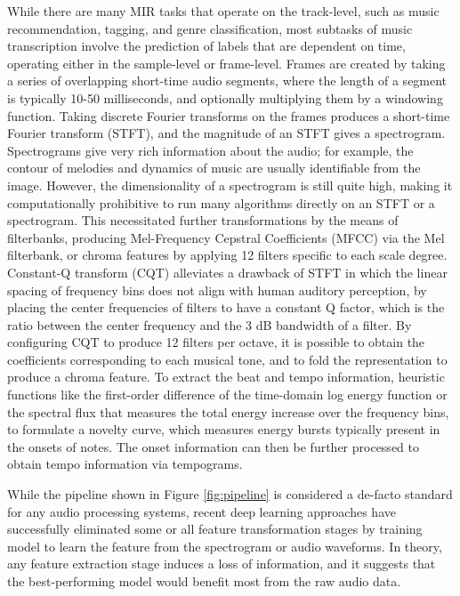 While there are many MIR tasks that operate on the track-level, such as music recommendation, tagging, and genre classification, most subtasks of music transcription involve the prediction of labels that are dependent on time, operating either in the sample-level or frame-level.
Frames are created by taking a series of overlapping short-time audio segments, where the length of a segment is typically 10-50 milliseconds, and optionally multiplying them by a windowing function.
Taking discrete Fourier transforms on the frames produces a short-time Fourier transform (STFT), and the magnitude of an STFT gives a spectrogram.
Spectrograms give very rich information about the audio; for example, the contour of melodies and dynamics of music are usually identifiable from the image.
However, the dimensionality of a spectrogram is still quite high, making it computationally prohibitive to run many algorithms directly on an STFT or a spectrogram.
This necessitated further transformations by the means of filterbanks, producing Mel-Frequency Cepstral Coefficients (MFCC) via the Mel filterbank, or chroma features by applying 12 filters specific to each scale degree.
Constant-Q transform (CQT) \cite{schorkhuber2010cqt} alleviates a drawback of STFT in which the linear spacing of frequency bins does not align with human auditory perception, by placing the center frequencies of filters to have a constant Q factor, which is the ratio between the center frequency and the 3 dB bandwidth of a filter.
By configuring CQT to produce 12 filters per octave, it is possible to obtain the coefficients corresponding to each musical tone, and to fold the representation to produce a chroma feature.
To extract the beat and tempo information, heuristic functions like the first-order difference of the time-domain log energy function or the spectral flux that measures the total energy increase over the frequency bins, to formulate a novelty curve, which measures energy bursts typically present in the onsets of notes.
The onset information can then be further processed to obtain tempo information via tempograms.



While the pipeline shown in Figure \ref{fig:pipeline} is considered a de-facto standard for any audio processing systems, recent deep learning approaches have successfully eliminated some or all feature transformation stages by training model to learn the feature from the spectrogram or audio waveforms.
In theory, any feature extraction stage induces a loss of information, and it suggests that the best-performing model would benefit most from the raw audio data.

